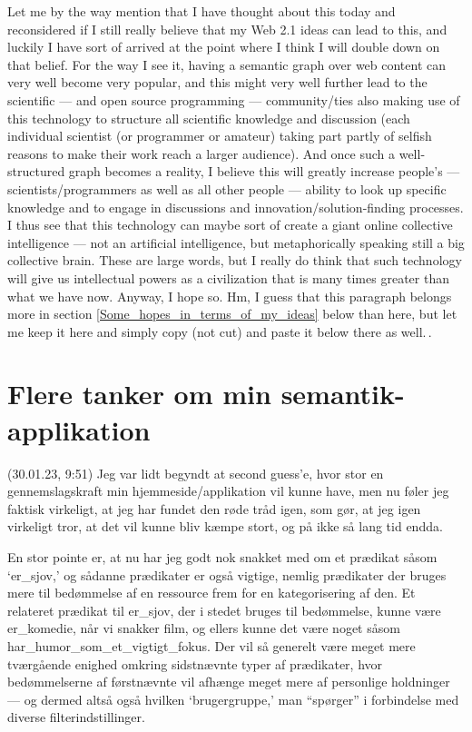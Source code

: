 \documentclass{report}
\begin{document}
Let me by the way mention that I have thought about this today and reconsidered if I still really believe that my Web 2.1 ideas can lead to this, and luckily I have sort of arrived at the point where I think I will double down on that belief. For the way I see it, having a semantic graph over web content can very well become very popular, and this might very well further lead to the scientific --- and open source programming --- community/ties also making use of this technology to structure all scientific knowledge and discussion (each individual scientist (or programmer or amateur) taking part partly of selfish reasons to make their work reach a larger audience). And once such a well-structured graph becomes a reality, I believe this will greatly increase people's --- scientists/programmers as well as all other people --- ability to look up specific knowledge and to engage in discussions and innovation/solution-finding processes. I thus see that this technology can maybe sort of create a giant online collective intelligence --- not an artificial intelligence, but metaphorically speaking still a big collective brain. These are large words, but I really do think that such technology will give us intellectual powers as a civilization that is many times greater than what we have now. Anyway, I hope so. Hm, I guess that this paragraph belongs more in section \ref{Some_hopes_in_terms_of_my_ideas} below than here, but let me keep it here and simply copy (not cut) and paste it below there as well.\,.




\section{Flere tanker om min semantik-applikation}

(30.01.23, 9:51) Jeg var lidt begyndt at second guess'e, hvor stor en gennemslagskraft min hjemmeside/applikation vil kunne have, men nu føler jeg faktisk virkeligt, at jeg har fundet den røde tråd igen, som gør, at jeg igen virkeligt tror, at det vil kunne bliv kæmpe stort, og på ikke så lang tid endda. 

En stor pointe er, at nu har jeg godt nok snakket med om et prædikat såsom `er\_sjov,' og sådanne prædikater er også vigtige, nemlig prædikater der bruges mere til bedømmelse af en ressource frem for en kategorisering af den. Et relateret prædikat til er\_sjov, der i stedet bruges til bedømmelse, kunne være er\_komedie, når vi snakker film, og ellers kunne det være noget såsom har\_humor\_som\_et\_vigtigt\_fokus. Der vil så generelt være meget mere tværgående enighed omkring sidstnævnte typer af prædikater, hvor bedømmelserne af førstnævnte vil afhænge meget mere af personlige holdninger --- og dermed altså også hvilken `brugergruppe,' man ``spørger'' i forbindelse med diverse filterindstillinger. 
\end{document}
